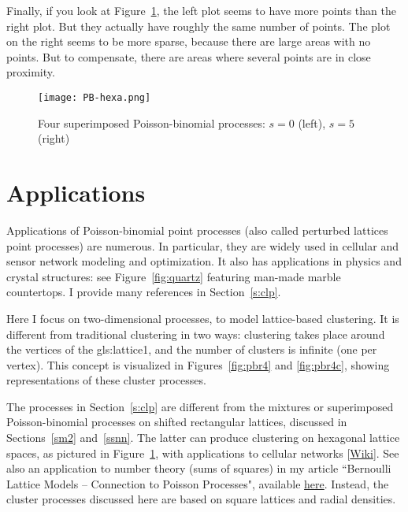 \documentclass[10pt]{article}
\begin{document}
Finally, if you look at Figure~\ref{fig:hexa}, the left plot seems to have more points than the right plot. But they actually have roughly the same number of points. The plot on the right seems to be more sparse, because there are large areas with no points. But to compensate, there are areas where several points are in close proximity.


\begin{figure}%
\centering
\texttt{[image: PB-hexa.png]}
\caption{Four superimposed Poisson-binomial processes: $s=0$ (left), $s=5$ (right)}
\label{fig:hexa}
\end{figure}


\section{Applications}

Applications of Poisson-binomial point processes (also called \textcolor{index}{perturbed lattices point processes}) are numerous. In particular, they are widely used in cellular and sensor network modeling and optimization. It also has applications in physics and crystal structures: see Figure~\ref{fig:quartz} featuring
 man-made marble
 countertops. I provide many references in Section~\ref{s:clp}.

Here I focus on two-dimensional processes, to model lattice-based clustering. It is different from traditional clustering in two ways: clustering
takes place around the vertices of the \gls{gls:lattice1}, and the number of clusters is infinite (one per \textcolor{index}{vertex}).
This concept is visualized in Figures~\ref{fig:pbr4} and \ref{fig:pbr4c}, showing representations of these
\textcolor{index}{cluster processes}.

The processes in Section~\ref{s:clp}  are different from the mixtures or superimposed  Poisson-binomial processes on \textcolor{index}{shifted rectangular lattices}, discussed in Sections~\ref{sm2} and~\ref{ssnn}. The latter can produce clustering on
\textcolor{index}{hexagonal} lattice spaces, as
 pictured in Figure~\ref{fig:hexa}, with
applications to cellular networks [\href{https://en.wikipedia.org/wiki/Cellular_network}{Wiki}]. See also
an application to number theory (sums of squares)
 in my article ``Bernoulli Lattice Models -- Connection to Poisson Processes", available \href{https://www.vgranville.com/2022/02/bernoulli-lattice-models-connection-to.html}{here}. Instead, the cluster processes discussed here are based on square lattices and radial densities.
\end{document}
